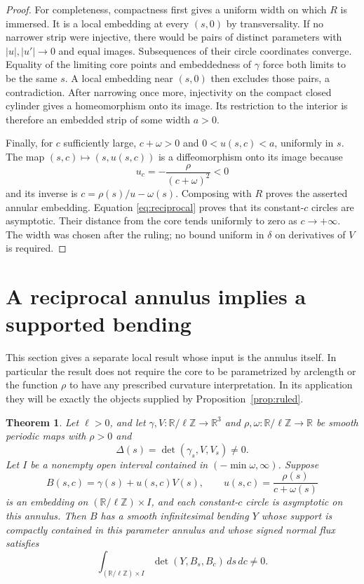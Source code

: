 \documentclass[11pt]{amsart}
\newtheorem{theorem}{Theorem}[section]
\theoremstyle{definition}
\newcommand{\R}{\mathbb R}
\begin{document}
\begin{proof}
For completeness, compactness first gives a uniform width on
which $R$ is immersed. It is a local embedding at every $(s,0)$
by transversality. If no narrower strip were injective, there would
be pairs of distinct parameters with $|u|,|u'|\to0$ and equal
images. Subsequences of their circle coordinates converge.
Equality of the limiting core points and embeddedness of $\gamma$
force both limits to be the same $s$. A local embedding near
$(s,0)$ then excludes those pairs, a contradiction.
After narrowing once more, injectivity on the compact closed
cylinder gives a homeomorphism onto its image. Its restriction
to the interior is therefore an embedded strip of some width $a>0$.

Finally, for $c$ sufficiently large, $c+\omega>0$ and
$0<u(s,c)<a$, uniformly in $s$. The map
$(s,c)\mapsto(s,u(s,c))$ is a diffeomorphism onto its image because
\[
 u_c=-\frac{\rho}{(c+\omega)^2}<0
\]
and its inverse is $c=\rho(s)/u-\omega(s)$.
Composing with $R$ proves the asserted annular embedding.
Equation \eqref{eq:reciprocal} proves that its constant-$c$ circles
are asymptotic. Their distance from the core tends uniformly to
zero as $c\to+\infty$.
The width was chosen after the ruling; no bound uniform in
$\delta$ on derivatives of $V$ is required.
\end{proof}

\section{A reciprocal annulus implies a supported bending}
\label{sec:bending}

This section gives a separate local result whose input is the
annulus itself. In particular the result does not require the core
to be parametrized by arclength or the function $\rho$ to have
any prescribed curvature interpretation. In its application they
will be exactly the objects supplied by Proposition~\ref{prop:ruled}.

\begin{theorem}\label{thm:band-bending}
Let $\ell>0$, and let $\gamma,V:\R/\ell\mathbb Z\to\R^3$ and
$\rho,\omega:\R/\ell\mathbb Z\to\R$ be smooth periodic maps with
$\rho>0$ and
\[
 \Delta(s)=\det(\gamma_s,V,V_s)\ne0.
\]
Let $I$ be a nonempty open interval contained in
$(-\min\omega,\infty)$. Suppose
\begin{equation}\label{eq:abstract-band}
 B(s,c)=\gamma(s)+u(s,c)V(s),\qquad
 u(s,c)=\frac{\rho(s)}{c+\omega(s)}
\end{equation}
is an embedding on $(\R/\ell\mathbb Z)\times I$, and each
constant-$c$ circle is asymptotic on this annulus.
Then $B$ has a smooth infinitesimal bending $Y$ whose support
is compactly contained in this parameter annulus and whose signed
normal flux satisfies
\begin{equation}\label{eq:band-flux}
 \int_{(\R/\ell\mathbb Z)\times I}
       \det(Y,B_s,B_c)\,ds\,dc\ne0.
\end{equation}
\end{theorem}
\end{document}
